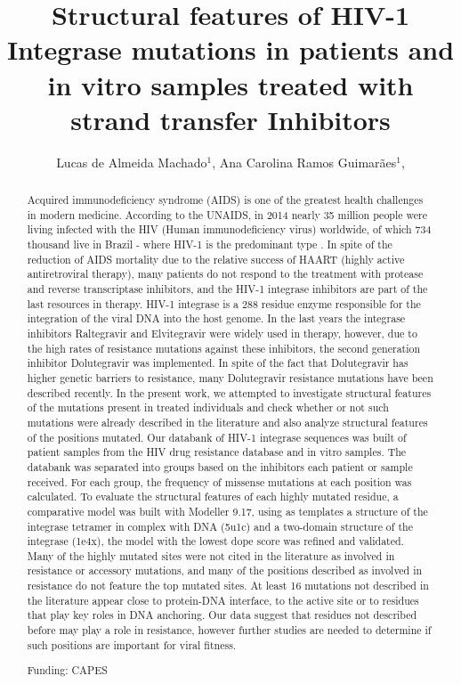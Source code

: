 \documentclass[twoside]{article}
\title{\vspace{-15mm}\fontsize{24pt}{10pt}\selectfont\textbf{ Structural features of HIV-1 Integrase mutations in patients and in vitro samples treated with strand transfer Inhibitors }} %
\author{ Lucas de Almeida Machado$^{1}$, Ana Carolina Ramos Guimarães$^{1}$, }
\affil{ 1 FIOCRUZ

 }
\date{}
\begin{document}
  
  
  \maketitle %
  
  
  \thispagestyle{fancy} %
  
  
  \begin{abstract}
  Acquired immunodeficiency syndrome (AIDS) is one of the greatest health challenges in modern medicine. According to the UNAIDS, in 2014  nearly 35 million people were living infected with the HIV (Human immunodeficiency virus) worldwide, of which 734 thousand live in Brazil - where HIV-1 is the predominant type . In spite of the reduction of AIDS mortality due to the relative success of HAART (highly active antiretroviral therapy), many patients do not respond to the treatment with protease and reverse transcriptase inhibitors, and the HIV-1 integrase inhibitors are part of the last resources in therapy. HIV-1 integrase is a 288 residue enzyme responsible for the integration of the viral DNA into the host genome. In the last years the integrase inhibitors Raltegravir and Elvitegravir were widely used in therapy, however, due to the high rates of resistance mutations  against these inhibitors, the second generation inhibitor Dolutegravir was implemented. In spite of the fact that Dolutegravir has higher genetic barriers to resistance, many Dolutegravir resistance mutations have been described recently. In the present work, we attempted to investigate  structural features of the mutations present in treated individuals and check whether or not such mutations were already described in the literature and also analyze structural features of the positions mutated. Our databank of HIV-1 integrase sequences was built of patient samples from the HIV drug resistance database and in vitro samples. The databank was separated into groups based on the inhibitors each patient or sample received. For each group, the frequency of missense mutations at each position was calculated. To evaluate  the structural features of each highly mutated residue, a comparative model was built with Modeller 9.17, using as templates a structure of the integrase tetramer in complex with DNA (5u1c) and a two-domain structure of the integrase (1e4x), the model with the lowest dope score was refined and validated. Many of the highly mutated sites were not cited in the literature as involved in resistance or accessory mutations, and many of the positions described as involved in resistance do not feature the top mutated sites. At least 16 mutations not described in the literature appear close to protein-DNA interface, to the active site or to residues that play key roles in DNA anchoring. Our data suggest that residues not described before may play a role in resistance, however further studies are needed to determine if such positions are important for viral fitness.
  
  Funding: CAPES \\ 
  \end{abstract}
  
\end{document}
